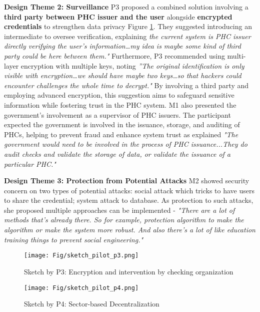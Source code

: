 \textbf{Design Theme 2: Surveillance} P3 proposed a combined solution involving a \textbf{third party between PHC issuer and the user} alongside \textbf{encrypted credentials} to strengthen data privacy Figure \ref{fig:sketch_pilot_p3}. They suggested introducing an intermediate to oversee verification, explaining \textit{the current system is PHC issuer directly verifying the user's information…my idea is maybe some kind of third party could be here between them." }Furthermore, P3 recommended using multi-layer encryption with multiple keys, noting \textit{”The original identification is only visible with encryption…we should have maybe two keys…so that hackers could encounter challenges the whole time to decrypt." } By involving a third party and employing advanced encryption, this suggestion aims to safeguard sensitive information while fostering trust in the PHC system. M1 also presented the government's involvement as a supervisor of PHC issuers. The participant expected the government is involved in the issuance, storage, and auditing of PHCs, helping to prevent fraud and enhance system trust as explained \textit{"The government would need to be involved in the process of PHC issuance...They do audit checks and validate the storage of data, or validate the issuance of a particular PHC."}

\textbf{Design Theme 3: Protection from Potential Attacks}
M2 showed security concern on two types of potential attacks: social attack which tricks to have users to share the credential; system attack to database. As protection to such attacks, she proposed multiple approaches can be implemented - \textit{"There are a lot of methods that's already there. So for example, protection algorithm to make the algorithm or make the system more robust. And also there's a lot of like education training things to prevent social engineering."}


\begin{figure}[!t]
 \vspace{-5pt}
	\centering
	\texttt{[image: Fig/sketch\_pilot\_p3.png]}
 \vspace{-15pt}
	\caption{Sketch by P3: Encryption and intervention by checking organization}
\label{fig:sketch_pilot_p3}
\vspace{-15pt}
\end{figure}


\begin{figure}[!t]
 \vspace{5pt}
	\centering
	\texttt{[image: Fig/sketch\_pilot\_p4.png]}
 \vspace{-15pt}
	\caption{Sketch by P4: Sector-based Decentralization}
\label{fig:sketch_pilot_p4}
\vspace{-15pt}
\end{figure}

